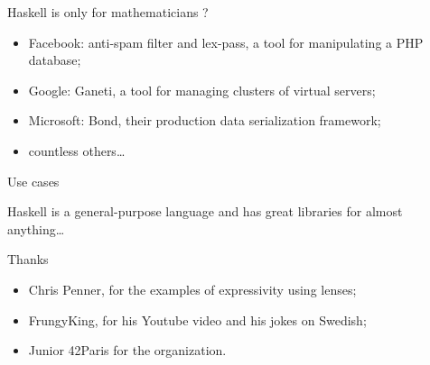 \documentclass{beamer}
\begin{document}
\begin{frame}{Haskell is only for mathematicians ?}
	\begin{itemize}
		\item<2-> Facebook: anti-spam filter and lex-pass, a tool for manipulating a PHP database;
		\item<3-> Google: Ganeti, a tool for managing clusters of virtual servers;
		\item<4-> Microsoft: Bond, their production data serialization framework;
		\item<5-> countless others\ldots
	\end{itemize}
\end{frame}

\begin{frame}{Use cases}

	Haskell is a general-purpose language and has great libraries for almost anything\ldots

	
\end{frame}

\begin{frame}{Thanks}

	\begin{itemize}
		\item Chris Penner, for the examples of expressivity using lenses;
		\item FrungyKing, for his Youtube video and his jokes on Swedish;
		\item Junior 42Paris for the organization.
	\end{itemize}

\end{frame}
\end{document}
